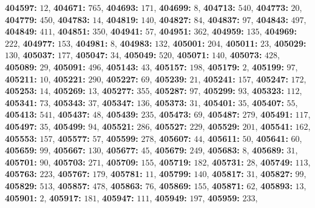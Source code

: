 \textsf{\bfseries 404597:} $12$, \textsf{\bfseries 404671:} $765$, \textsf{\bfseries 404693:} $171$, \textsf{\bfseries 404699:} $8$, \textsf{\bfseries 404713:} $540$, \textsf{\bfseries 404773:} $20$, \textsf{\bfseries 404779:} $450$, \textsf{\bfseries 404783:} $14$, \textsf{\bfseries 404819:} $140$, \textsf{\bfseries 404827:} $84$, \textsf{\bfseries 404837:} $97$, \textsf{\bfseries 404843:} $497$, \textsf{\bfseries 404849:} $411$, \textsf{\bfseries 404851:} $350$, \textsf{\bfseries 404941:} $57$, \textsf{\bfseries 404951:} $362$, \textsf{\bfseries 404959:} $135$, \textsf{\bfseries 404969:} $222$, \textsf{\bfseries 404977:} $153$, \textsf{\bfseries 404981:} $8$, \textsf{\bfseries 404983:} $132$, \textsf{\bfseries 405001:} $204$, \textsf{\bfseries 405011:} $23$, \textsf{\bfseries 405029:} $130$, \textsf{\bfseries 405037:} $177$, \textsf{\bfseries 405047:} $34$, \textsf{\bfseries 405049:} $520$, \textsf{\bfseries 405071:} $140$, \textsf{\bfseries 405073:} $428$, \textsf{\bfseries 405089:} $29$, \textsf{\bfseries 405091:} $496$, \textsf{\bfseries 405143:} $43$, \textsf{\bfseries 405157:} $198$, \textsf{\bfseries 405179:} $2$, \textsf{\bfseries 405199:} $97$, \textsf{\bfseries 405211:} $10$, \textsf{\bfseries 405221:} $290$, \textsf{\bfseries 405227:} $69$, \textsf{\bfseries 405239:} $21$, \textsf{\bfseries 405241:} $157$, \textsf{\bfseries 405247:} $172$, \textsf{\bfseries 405253:} $14$, \textsf{\bfseries 405269:} $13$, \textsf{\bfseries 405277:} $355$, \textsf{\bfseries 405287:} $97$, \textsf{\bfseries 405299:} $93$, \textsf{\bfseries 405323:} $112$, \textsf{\bfseries 405341:} $73$, \textsf{\bfseries 405343:} $37$, \textsf{\bfseries 405347:} $136$, \textsf{\bfseries 405373:} $31$, \textsf{\bfseries 405401:} $35$, \textsf{\bfseries 405407:} $55$, \textsf{\bfseries 405413:} $541$, \textsf{\bfseries 405437:} $48$, \textsf{\bfseries 405439:} $235$, \textsf{\bfseries 405473:} $69$, \textsf{\bfseries 405487:} $279$, \textsf{\bfseries 405491:} $117$, \textsf{\bfseries 405497:} $35$, \textsf{\bfseries 405499:} $94$, \textsf{\bfseries 405521:} $286$, \textsf{\bfseries 405527:} $229$, \textsf{\bfseries 405529:} $201$, \textsf{\bfseries 405541:} $162$, \textsf{\bfseries 405553:} $157$, \textsf{\bfseries 405577:} $57$, \textsf{\bfseries 405599:} $278$, \textsf{\bfseries 405607:} $44$, \textsf{\bfseries 405611:} $50$, \textsf{\bfseries 405641:} $60$, \textsf{\bfseries 405659:} $99$, \textsf{\bfseries 405667:} $130$, \textsf{\bfseries 405677:} $45$, \textsf{\bfseries 405679:} $249$, \textsf{\bfseries 405683:} $8$, \textsf{\bfseries 405689:} $31$, \textsf{\bfseries 405701:} $90$, \textsf{\bfseries 405703:} $271$, \textsf{\bfseries 405709:} $155$, \textsf{\bfseries 405719:} $182$, \textsf{\bfseries 405731:} $28$, \textsf{\bfseries 405749:} $113$, \textsf{\bfseries 405763:} $223$, \textsf{\bfseries 405767:} $179$, \textsf{\bfseries 405781:} $11$, \textsf{\bfseries 405799:} $140$, \textsf{\bfseries 405817:} $31$, \textsf{\bfseries 405827:} $99$, \textsf{\bfseries 405829:} $513$, \textsf{\bfseries 405857:} $478$, \textsf{\bfseries 405863:} $76$, \textsf{\bfseries 405869:} $155$, \textsf{\bfseries 405871:} $62$, \textsf{\bfseries 405893:} $13$, \textsf{\bfseries 405901:} $2$, \textsf{\bfseries 405917:} $181$, \textsf{\bfseries 405947:} $111$, \textsf{\bfseries 405949:} $197$, \textsf{\bfseries 405959:} $233$, 
